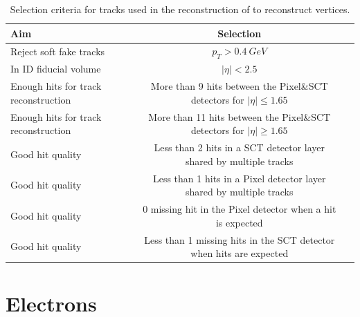\begin{table}[tbh]
    \centering
    \scriptsize
    \begin{tabular}{|l|c|c}
        \hline
        Aim & Selection \\
        \hline
        Reject soft fake tracks &$p_T> 0.4~GeV$ \\
        \hline
        In ID fiducial volume &$|\eta| < 2.5$ \\
        \hline
        Enough hits for track reconstruction & More than 9 hits between the Pixel\&SCT detectors for $|\eta|\le 1.65$ \\
        \hline
        Enough hits for track reconstruction & More than 11 hits between the Pixel\&SCT detectors for $|\eta|\ge 1.65$ \\
        \hline
        Good hit quality & Less than 2 hits in a SCT detector layer shared by multiple tracks \\
        \hline
        Good hit quality & Less than 1 hits in a Pixel detector layer shared by multiple tracks \\
        \hline
        Good hit quality & 0 missing hit in the Pixel detector when a hit is expected \\
        \hline
        Good hit quality & Less than 1 missing hits in the SCT detector when hits are expected \\
        \hline
    \end{tabular}
    \caption{Selection criteria for tracks used in the reconstruction of to reconstruct vertices.}
    \label{tab:pv}
\end{table}

\section{Electrons}
\label{sec:el}


